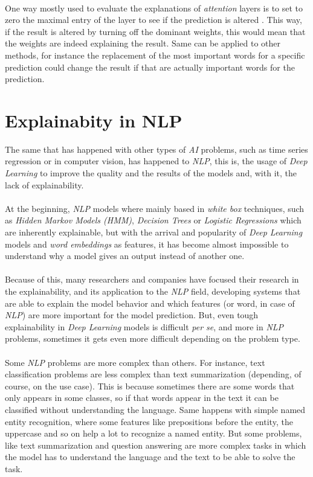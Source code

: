 \paragraph{}
One way mostly used to evaluate the explanations of \emph{attention} layers is to set to zero the maximal entry of the layer to see if the prediction is altered \cite{Serrano2019}. This way, if the result is altered by turning off the dominant weights, this would mean that the weights are indeed explaining the result. Same can be applied to other methods, for instance the replacement of the most important words for a specific prediction could change the result if that are actually important words for the prediction.
\section{Explainabity in NLP}
\label{sec:ExplainabilityNLP}
\noindent The same that has happened with other types of \emph{AI} problems, such as time series regression or in computer vision, has happened to \emph{NLP}, this is, the usage of \emph{Deep Learning} to improve the quality and the results of the models and, with it, the lack of explainability.
\paragraph{}
At the beginning, \emph{NLP} models where mainly based in \emph{white box} techniques, such as \emph{Hidden Markov Models (HMM)}, \emph{Decision Trees} or \emph{Logistic Regressions} which are inherently explainable, but with the arrival and popularity of \emph{Deep Learning} models and \emph{word embeddings} as features, it has become almost impossible to understand why a model gives an output instead of another one. 
\paragraph{}
Because of this, many researchers and companies have focused their research in the explainability, and its application to the \emph{NLP} field, developing systems that are able to explain the model behavior and which features (or word, in case of \emph{NLP}) are more important for the model prediction. But, even tough explainability in \emph{Deep Learning} models is difficult \emph{per se}, and more in \emph{NLP} problems, sometimes it gets even more difficult depending on the problem type.
\paragraph{}
Some \emph{NLP} problems are more complex than others. For instance, text classification problems are less complex than text summarization (depending, of course, on the use case). This is because sometimes there are some words that only appears in some classes, so if that words appear in the text it can be classified without understanding the language. Same happens with simple named entity recognition, where some features like prepositions before the entity, the uppercase and so on help a lot to recognize a named entity. But some problems, like text summarization and question answering are more complex tasks in which the model has to understand the language and the text to be able to solve the task.
